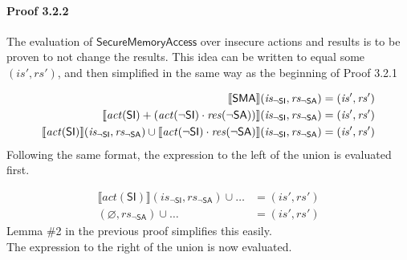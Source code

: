 \documentclass[12pt, letterpaper]{article}
\let\emptyset\varnothing
\newcommand\interp[1]{\llbracket #1 \rrbracket}
\begin{document}
 \paragraph{Proof 3.2.2}
     The evaluation of $\mathsf{SecureMemoryAccess}$ over insecure actions and results is to be proven to not change the results.  This idea can be written to equal some $(\mathit{is}', \mathit{rs}')$, and then simplified in the same way as the beginning of Proof 3.2.1
 \par\nobreak
 {\fontsize{10pt}{12pt}\selectfont
 \begin{align}
     \setcounter{equation}{0}
     \interp{ \mathsf{SMA} } (\mathit{is_{\mathsf{\neg SI}}}, \mathit{rs_{\mathsf{\neg SA}}})
     &=
     (\mathit{is}', \mathit{rs}')
     \\
     \interp{ \mathit{act}(\mathsf{SI}) +
     (\mathit{act}(\neg\mathsf{SI}) \cdot
      \mathit{res}(\neg\mathsf{SA}))  } (\mathit{is_{\mathsf{\neg SI}}}, \mathit{rs_{\mathsf{\neg SA}}})
     &=
     (\mathit{is}', \mathit{rs}')
     \\
     \interp{ \mathit{act}(\mathsf{SI}) } (\mathit{is_{\mathsf{\neg SI}}}, \mathit{rs_{\mathsf{\neg SA}}}) \cup %
     \interp{ \mathit{act}(\neg\mathsf{SI}) \cdot
      \mathit{res}(\neg\mathsf{SA}) } (\mathit{is_{\mathsf{\neg SI}}}, \mathit{rs_{\mathsf{\neg SA}}})
     &=
     (\mathit{is}', \mathit{rs}')
 \end{align}
 }%
     Following the same format, the expression to the left of the union is evaluated first.
 \par\nobreak
 {\fontsize{10pt}{12pt}\selectfont
 \begin{align}
     \interp{ \mathit{act}(\mathsf{SI}) } (\mathit{is_{\mathsf{\neg SI}}}, \mathit{rs_{\mathsf{\neg SA}}}) \cup \ldots
     &=
     (\mathit{is}', \mathit{rs}')
     \\
     (\emptyset, \mathit{rs_{\mathsf{\neg SA}}}) \cup \ldots
     &=
     (\mathit{is}', \mathit{rs}')
 \end{align}
 }%
     Lemma \#2 in the previous proof simplifies this easily.\\
     The expression to the right of the union is now evaluated.
 \par\nobreak
\end{document}
